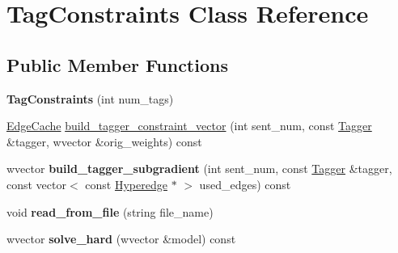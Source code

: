 \hypertarget{class_tag_constraints}{
\section{TagConstraints Class Reference}
\label{class_tag_constraints}
}
\subsection*{Public Member Functions}
\begin{DoxyCompactItemize}
\item 
\hypertarget{class_tag_constraints_a58a2e5245400d411de24e36534d11945}{
{\bfseries TagConstraints} (int num\_\-tags)}
\label{class_tag_constraints_a58a2e5245400d411de24e36534d11945}

\item 
\hyperlink{class_cache}{EdgeCache} \hyperlink{class_tag_constraints_adec1a1de8fb49e79b52c4c93517414a0}{build\_\-tagger\_\-constraint\_\-vector} (int sent\_\-num, const \hyperlink{class_tagger}{Tagger} \&tagger, wvector \&orig\_\-weights) const 
\item 
\hypertarget{class_tag_constraints_acec3818d7505e9147828ab7cb3863001}{
wvector {\bfseries build\_\-tagger\_\-subgradient} (int sent\_\-num, const \hyperlink{class_tagger}{Tagger} \&tagger, const vector$<$ const \hyperlink{class_scarab_1_1_h_g_1_1_hyperedge}{Hyperedge} $\ast$ $>$ used\_\-edges) const }
\label{class_tag_constraints_acec3818d7505e9147828ab7cb3863001}

\item 
\hypertarget{class_tag_constraints_a8b8df130795f2fbc1ce2aac375dfc00a}{
void {\bfseries read\_\-from\_\-file} (string file\_\-name)}
\label{class_tag_constraints_a8b8df130795f2fbc1ce2aac375dfc00a}

\item 
\hypertarget{class_tag_constraints_a3e490a8d4d335ed4d04803fab0a82871}{
wvector {\bfseries solve\_\-hard} (wvector \&model) const }
\label{class_tag_constraints_a3e490a8d4d335ed4d04803fab0a82871}

\end{DoxyCompactItemize}
